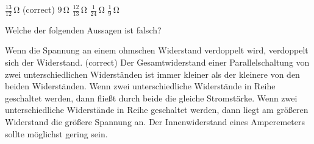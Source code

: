\documentclass[11pt]{exam}
\begin{document}
\begin{questions}
\begin{choices}
	\choice \(\mathrm{\frac{13}{12}\,\Omega}\) (correct)
	\choice \(\mathrm{9\,\Omega}\)
	\choice \(\mathrm{\frac{12}{13}\,\Omega}\)
	\choice \(\mathrm{\frac{1}{24}\,\Omega}\)
	\choice \(\mathrm{\frac{1}{9}\,\Omega}\)
\end{choices}

\vspace{3mm}\question Welche der folgenden Aussagen ist falsch?

\begin{choices}
	\choice Wenn die Spannung an einem ohmschen Widerstand verdoppelt wird, verdoppelt sich der Widerstand. (correct)
	\choice Der Gesamtwiderstand einer Parallelschaltung von zwei unterschiedlichen Widerständen ist immer kleiner als der kleinere von den beiden Widerständen.
	\choice Wenn zwei unterschiedliche Widerstände in Reihe geschaltet werden, dann fließt durch beide die gleiche Stromstärke.
	\choice Wenn zwei unterschiedliche Widerstände in Reihe geschaltet werden, dann liegt am größeren Widerstand die größere Spannung an.
	\choice Der Innenwiderstand eines Amperemeters sollte möglichst gering sein.
\end{choices}

\vspace{3mm}\end{questions}
\end{document}
